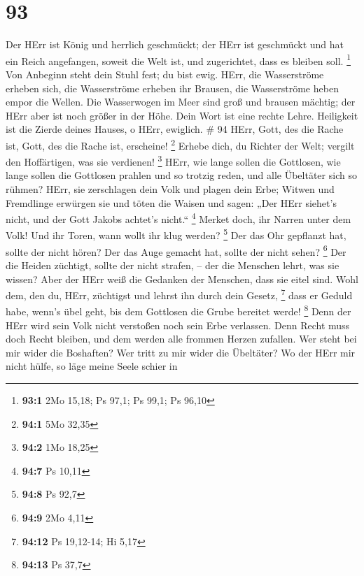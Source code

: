 \hypertarget{section-30}{%
\section{93}\label{section-30}}

 Der HErr ist König und herrlich geschmückt; der HErr ist
geschmückt und hat ein Reich angefangen, soweit die Welt ist, und
zugerichtet, dass es bleiben soll. \footnote{\textbf{93:1} 2Mo 15,18; Ps
  97,1; Ps 99,1; Ps 96,10}  Von Anbeginn steht dein Stuhl
fest; du bist ewig.  HErr, die Wasserströme erheben sich,
die Wasserströme erheben ihr Brausen, die Wasserströme heben empor die
Wellen.  Die Wasserwogen im Meer sind groß und brausen
mächtig; der HErr aber ist noch größer in der Höhe.  Dein
Wort ist eine rechte Lehre. Heiligkeit ist die Zierde deines Hauses, o
HErr, ewiglich. \# 94  HErr, Gott, des die Rache ist, Gott,
des die Rache ist, erscheine! \footnote{\textbf{94:1} 5Mo 32,35}
 Erhebe dich, du Richter der Welt; vergilt den Hoffärtigen,
was sie verdienen! \footnote{\textbf{94:2} 1Mo 18,25}  HErr,
wie lange sollen die Gottlosen, wie lange sollen die Gottlosen prahlen
 und so trotzig reden, und alle Übeltäter sich so rühmen?
 HErr, sie zerschlagen dein Volk und plagen dein Erbe;
 Witwen und Fremdlinge erwürgen sie und töten die Waisen
 und sagen: „Der HErr siehet's nicht, und der Gott Jakobs
achtet's nicht.`` \footnote{\textbf{94:7} Ps 10,11}  Merket
doch, ihr Narren unter dem Volk! Und ihr Toren, wann wollt ihr klug
werden? \footnote{\textbf{94:8} Ps 92,7}  Der das Ohr
gepflanzt hat, sollte der nicht hören? Der das Auge gemacht hat, sollte
der nicht sehen? \footnote{\textbf{94:9} 2Mo 4,11}  Der die
Heiden züchtigt, sollte der nicht strafen, -- der die Menschen lehrt,
was sie wissen?  Aber der HErr weiß die Gedanken der
Menschen, dass sie eitel sind.  Wohl dem, den du, HErr,
züchtigst und lehrst ihn durch dein Gesetz, \footnote{\textbf{94:12} Ps
  19,12-14; Hi 5,17}  dass er Geduld habe, wenn's übel
geht, bis dem Gottlosen die Grube bereitet werde! \footnote{\textbf{94:13}
  Ps 37,7}  Denn der HErr wird sein Volk nicht verstoßen
noch sein Erbe verlassen.  Denn Recht muss doch Recht
bleiben, und dem werden alle frommen Herzen zufallen.  Wer
steht bei mir wider die Boshaften? Wer tritt zu mir wider die Übeltäter?
 Wo der HErr mir nicht hülfe, so läge meine Seele schier in
